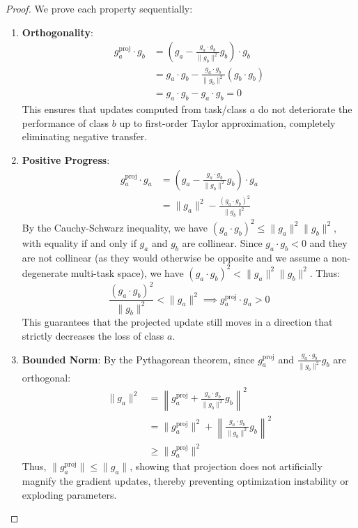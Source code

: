 \documentclass{article}
\theoremstyle{plain}
\theoremstyle{definition}
\theoremstyle{remark}
\begin{document}
\begin{proof}
We prove each property sequentially:
\begin{enumerate}
    \item \textbf{Orthogonality}:
    \begin{align}
    g_a^{\text{proj}} \cdot g_b &= \left(g_a - \frac{g_a \cdot g_b}{\|g_b\|^2} g_b\right) \cdot g_b \\
    &= g_a \cdot g_b - \frac{g_a \cdot g_b}{\|g_b\|^2} (g_b \cdot g_b) \\
    &= g_a \cdot g_b - g_a \cdot g_b = 0
    \end{align}
    This ensures that updates computed from task/class $a$ do not deteriorate the performance of class $b$ up to first-order Taylor approximation, completely eliminating negative transfer.
    
    \item \textbf{Positive Progress}:
    \begin{align}
    g_a^{\text{proj}} \cdot g_a &= \left(g_a - \frac{g_a \cdot g_b}{\|g_b\|^2} g_b\right) \cdot g_a \\
    &= \|g_a\|^2 - \frac{(g_a \cdot g_b)^2}{\|g_b\|^2}
    \end{align}
    By the Cauchy-Schwarz inequality, we have $(g_a \cdot g_b)^2 \le \|g_a\|^2 \|g_b\|^2$, with equality if and only if $g_a$ and $g_b$ are collinear. Since $g_a \cdot g_b < 0$ and they are not collinear (as they would otherwise be opposite and we assume a non-degenerate multi-task space), we have $(g_a \cdot g_b)^2 < \|g_a\|^2 \|g_b\|^2$. Thus:
    \begin{equation}
    \frac{(g_a \cdot g_b)^2}{\|g_b\|^2} < \|g_a\|^2 \implies g_a^{\text{proj}} \cdot g_a > 0
    \end{equation}
    This guarantees that the projected update still moves in a direction that strictly decreases the loss of class $a$.
    
    \item \textbf{Bounded Norm}:
    By the Pythagorean theorem, since $g_a^{\text{proj}}$ and $\frac{g_a \cdot g_b}{\|g_b\|^2} g_b$ are orthogonal:
    \begin{align}
    \|g_a\|^2 &= \left\|g_a^{\text{proj}} + \frac{g_a \cdot g_b}{\|g_b\|^2} g_b\right\|^2 \\
    &= \|g_a^{\text{proj}}\|^2 + \left\|\frac{g_a \cdot g_b}{\|g_b\|^2} g_b\right\|^2 \\
    &\ge \|g_a^{\text{proj}}\|^2
    \end{align}
    Thus, $\|g_a^{\text{proj}}\| \le \|g_a\|$, showing that projection does not artificially magnify the gradient updates, thereby preventing optimization instability or exploding parameters.
\end{enumerate}
\end{proof}
\end{document}
